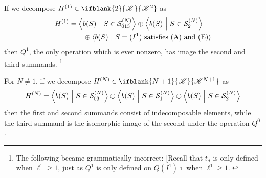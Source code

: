 \documentclass[10pt]{article}
\newcommand{\LL}[1]{\ifblank{#1}{\scrK}{\scrK^{#1}}}
\renewcommand{\Q}{Q}
\begin{document}
\begin{CalculatingRepeatedKoszul}
\begin{thm}\label{longDescriptionOfHN}
If we decompose $H^{(1)}\in\LL{2}$ as
\begin{alignat*}{2}
H^{(1)}
&=
\left\langle b(S)\ \middle|\ S\in\calS_{013}^{(N)}\right\rangle\oplus\left\langle b(S)\ \middle|\ S\in\calS_{2}^{(N)}\right\rangle
\\
&
\quad\quad  \oplus\langle b(S)\ |\ S=(I^1)\textup{ satisfies (A) and (E)}\rangle%
\end{alignat*}
then $\Q^1$, the only operation which is ever nonzero, has image the second and third summands.%
\footnote{The following became grammatically incorrect: [Recall that $t_d$ is only defined when $\ell^1\geq1$, just as $Q^1$ is only defined on $Q(I^1)\imath$ when $\ell^1\geq1$.]}

For $N\neq1$, if we decompose $H^{(N)}\in\LL{N+1}$ as
\[H^{(N)}=
\left\langle b(S)\ \middle|\ S\in\mathcal{S}_{03}^{(N)}\right\rangle\oplus
\left\langle b(S)\ \middle|\ S\in\mathcal{S}_1^{(N)}\right\rangle \oplus \left\langle b(S)\ \middle|\ S\in\mathcal{S}_2^{(N)}\right\rangle\]
then the first and second summands consist of indecomposable elements, while the third summand is the isomorphic image of the second under the operation $\Q^0$.


\end{thm}
\end{CalculatingRepeatedKoszul}
\end{document}
